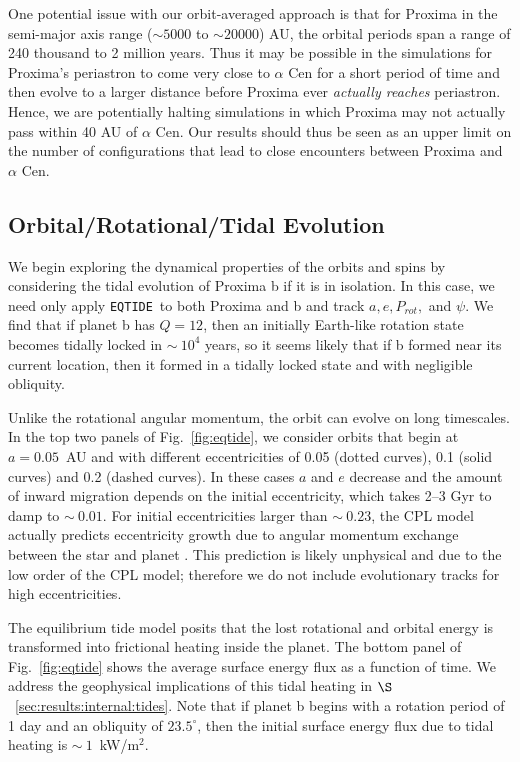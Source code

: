 \documentclass[preprint,12pt]{aastex}
\def\eqtide{\texttt{\footnotesize{EQTIDE}}\xspace}
\begin{document}
One potential issue with our orbit-averaged approach is that for Proxima in the 
semi-major axis range ($\sim5000$ to $\sim20000$) AU, the orbital periods 
span a range of 240 thousand to 2 million years. Thus it may be possible in 
the simulations for Proxima's periastron to come very close to $\alpha$ Cen 
for a short period of time and then evolve to a larger distance before Proxima 
ever \emph{actually reaches} periastron. Hence, we are potentially halting 
simulations in which 
Proxima may not actually pass within 40 AU of $\alpha$ Cen. Our results 
should thus be seen as an upper limit on the number of configurations 
that lead to close encounters between Proxima and $\alpha$ Cen.
 
\subsection{Orbital/Rotational/Tidal Evolution}
\label{sec:results:orbital}

We begin exploring the dynamical properties of the orbits and spins by
considering the tidal evolution of Proxima b if it is in isolation. In
this case, we need only apply \eqtide~to both Proxima and b and track
$a, e, P_{rot},$ and $\psi$. We find that if planet b has $Q=12$,
then an initially Earth-like rotation state becomes tidally locked in
$\sim~10^4$ years, so it seems likely that if b formed near its
current location, then it formed in a tidally locked state and with
negligible obliquity.

Unlike the rotational angular momentum, the orbit can evolve on long
timescales. In the top two panels of Fig.~\ref{fig:eqtide}, we
consider orbits that begin at $a=0.05$~AU and with different
eccentricities of 0.05 (dotted curves), 0.1 (solid curves) and 0.2
(dashed curves). In these cases $a$ and $e$ decrease and the amount of
inward migration depends on the initial eccentricity, which takes 2--3
Gyr to damp to $\sim~0.01$. For initial eccentricities larger than
$\sim~0.23$, the CPL model actually predicts eccentricity growth due
to angular momentum exchange between the star and planet
\citep{Barnes16}. This prediction is likely unphysical and due to the
low order of the CPL model; therefore we do not include evolutionary
tracks for high eccentricities.

The equilibrium tide model posits that the lost rotational and orbital
energy is transformed into frictional heating inside the planet. The
bottom panel of Fig.~\ref{fig:eqtide} shows the average surface energy
flux as a function of time. We address the geophysical implications of
this tidal heating in $\S$~\ref{sec:results:internal:tides}. Note that if planet
b begins with a rotation period of 1 day and an obliquity of
$23.5^\circ$, then the initial surface energy flux due to tidal
heating is $\sim~1$~kW/m$^{2}$.
\end{document}
